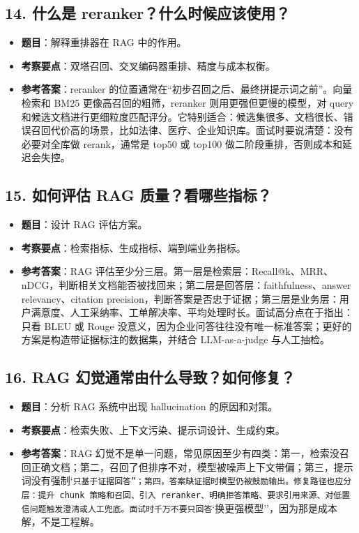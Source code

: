 \subsection{14. 什么是 reranker？什么时候应该使用？}
\begin{itemize}[leftmargin=2em]
\item \textbf{题目}：解释重排器在 RAG 中的作用。
\item \textbf{考察要点}：双塔召回、交叉编码器重排、精度与成本权衡。
\item \textbf{参考答案}：reranker 的位置通常在``初步召回之后、最终拼提示词之前''。向量检索和 BM25 更像高召回的粗筛，reranker 则用更强但更慢的模型，对 query 和候选文档进行更细粒度匹配评分。它特别适合：候选集很多、文档很长、错误召回代价高的场景，比如法律、医疗、企业知识库。面试时要说清楚：没有必要对全库做 rerank，通常是 top50 或 top100 做二阶段重排，否则成本和延迟会失控。
\end{itemize}

\subsection{15. 如何评估 RAG 质量？看哪些指标？}
\begin{itemize}[leftmargin=2em]
\item \textbf{题目}：设计 RAG 评估方案。
\item \textbf{考察要点}：检索指标、生成指标、端到端业务指标。
\item \textbf{参考答案}：RAG 评估至少分三层。第一层是检索层：Recall@k、MRR、nDCG，判断相关文档能否被找回来；第二层是回答层：faithfulness、answer relevancy、citation precision，判断答案是否忠于证据；第三层是业务层：用户满意度、人工采纳率、工单解决率、平均处理时长。面试高分点在于指出：只看 BLEU 或 Rouge 没意义，因为企业问答往往没有唯一标准答案；更好的方案是构造带证据标注的数据集，并结合 LLM-as-a-judge 与人工抽检。
\end{itemize}

\subsection{16. RAG 幻觉通常由什么导致？如何修复？}
\begin{itemize}[leftmargin=2em]
\item \textbf{题目}：分析 RAG 系统中出现 hallucination 的原因和对策。
\item \textbf{考察要点}：检索失败、上下文污染、提示词设计、生成约束。
\item \textbf{参考答案}：RAG 幻觉不是单一问题，常见原因至少有四类：第一，检索没召回正确文档；第二，召回了但排序不对，模型被噪声上下文带偏；第三，提示词没有强制`\texttt{只基于证据回答''；第四，答案缺证据时模型仍被鼓励输出。修复路径也应分层：提升 chunk 策略和召回、引入 reranker、明确拒答策略、要求引用来源、对低置信问题触发澄清或人工兜底。面试时千万不要只回答}`换更强模型''，因为那是成本解，不是工程解。
\end{itemize}

